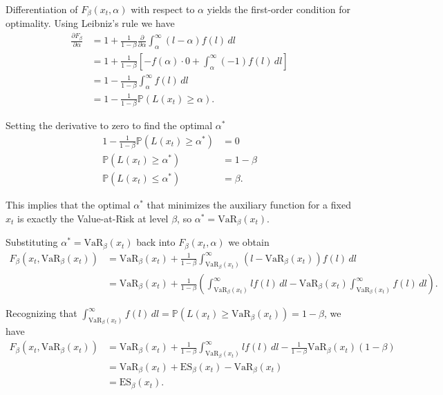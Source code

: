 Differentiation of $F_\beta(x_t, \alpha)$ with respect to $\alpha$ yields the first-order condition for optimality. Using Leibniz's rule we have
\begin{align*}
    \frac{\partial F_\beta}{\partial \alpha} 
    &= 1 + \frac{1}{1-\beta} \frac{\partial}{\partial \alpha} \int_\alpha^\infty (l - \alpha) f(l) \, dl \\
    &= 1 + \frac{1}{1-\beta} \left[ -f(\alpha) \cdot 0 + \int_\alpha^\infty (-1) f(l) \, dl \right] \\
    &= 1 - \frac{1}{1-\beta} \int_\alpha^\infty f(l) \, dl \\
    &= 1 - \frac{1}{1-\beta} \mathbb{P}(L(x_t) \ge \alpha).
\end{align*}

Setting the derivative to zero to find the optimal $\alpha^*$
\begin{align*}
    1 - \frac{1}{1-\beta} \mathbb{P}(L(x_t) \ge \alpha^*) &= 0 \\
    \mathbb{P}(L(x_t) \ge \alpha^*) &= 1 - \beta \\
    \mathbb{P}(L(x_t) \le \alpha^*) &= \beta.
\end{align*}

This implies that the optimal $\alpha^*$ that minimizes the auxiliary function for a fixed $x_t$ is exactly the Value-at-Risk at level $\beta$, so $\alpha^* = \text{VaR}_\beta(x_t)$.

Substituting $\alpha^* = \text{VaR}_\beta(x_t)$ back into $F_\beta(x_t, \alpha)$ we obtain
\begin{align*}
    F_\beta(x_t, \text{VaR}_\beta(x_t)) &= \text{VaR}_\beta(x_t) + \frac{1}{1-\beta} \int_{\text{VaR}_\beta(x_t)}^\infty (l - \text{VaR}_\beta(x_t)) f(l) \, dl \\
    &= \text{VaR}_\beta(x_t) + \frac{1}{1-\beta} \left( \int_{\text{VaR}_\beta(x_t)}^\infty l f(l) \, dl - \text{VaR}_\beta(x_t) \int_{\text{VaR}_\beta(x_t)}^\infty f(l) \, dl \right).
\end{align*}

Recognizing that $\int_{\text{VaR}_\beta(x_t)}^\infty f(l) \, dl = \mathbb{P}(L(x_t) \ge \text{VaR}_\beta(x_t)) = 1-\beta$, we have
\begin{align*}
    F_\beta(x_t, \text{VaR}_\beta(x_t)) &= \text{VaR}_\beta(x_t) + \frac{1}{1-\beta} \int_{\text{VaR}_\beta(x_t)}^\infty l f(l) \, dl - \frac{1}{1-\beta} \text{VaR}_\beta(x_t) (1-\beta) \\
    &= \text{VaR}_\beta(x_t) + \text{ES}_\beta(x_t) - \text{VaR}_\beta(x_t) \\
    &= \text{ES}_\beta(x_t).
\end{align*}


